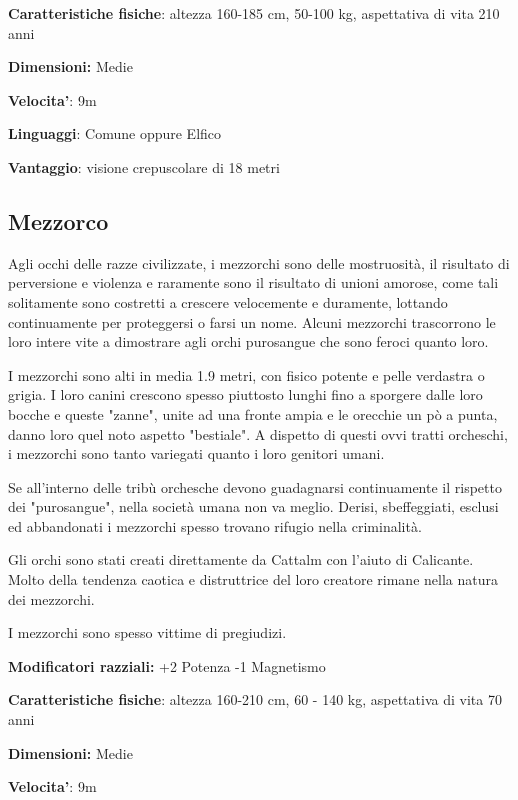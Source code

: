 \documentclass[a4paper,11pt,twoside,openany]{book}
\begin{document}
\textbf{Caratteristiche fisiche}: altezza 160-185 cm, 50-100 kg, aspettativa di vita 210 anni

\textbf{Dimensioni:} Medie

\textbf{Velocita'}: 9m

\textbf{Linguaggi}: Comune oppure Elfico

\textbf{Vantaggio}: visione crepuscolare di 18 metri


\subsection{Mezzorco}

\label{mezzorco}

Agli occhi delle razze civilizzate, i mezzorchi sono delle mostruosità, il risultato di perversione e violenza e raramente sono il risultato di unioni amorose, come tali solitamente sono costretti a crescere velocemente e duramente, lottando continuamente per proteggersi o farsi un nome. Alcuni mezzorchi trascorrono le loro intere vite a dimostrare agli orchi purosangue che sono feroci quanto loro.

I mezzorchi sono alti in media 1.9 metri, con fisico potente e pelle verdastra o grigia. I loro canini crescono spesso piuttosto lunghi fino a sporgere dalle loro bocche e queste "zanne", unite ad una fronte ampia e le orecchie un pò a punta, danno loro quel noto aspetto "bestiale". A dispetto di questi ovvi tratti orcheschi, i mezzorchi sono tanto variegati quanto i loro genitori umani.

Se all'interno delle tribù orchesche devono guadagnarsi continuamente il rispetto dei "purosangue", nella società umana non va meglio. Derisi, sbeffeggiati, esclusi ed abbandonati i mezzorchi spesso trovano rifugio nella criminalità.

Gli orchi sono stati creati direttamente da Cattalm con l'aiuto di Calicante. Molto della tendenza caotica e distruttrice del loro creatore rimane nella natura dei mezzorchi.

I mezzorchi sono spesso vittime di pregiudizi.

\textbf{Modificatori razziali:} +2 Potenza -1 Magnetismo

\textbf{Caratteristiche fisiche}: altezza 160-210 cm, 60 - 140 kg,
aspettativa di vita 70 anni

\textbf{Dimensioni:} Medie

\textbf{Velocita'}: 9m
\end{document}

